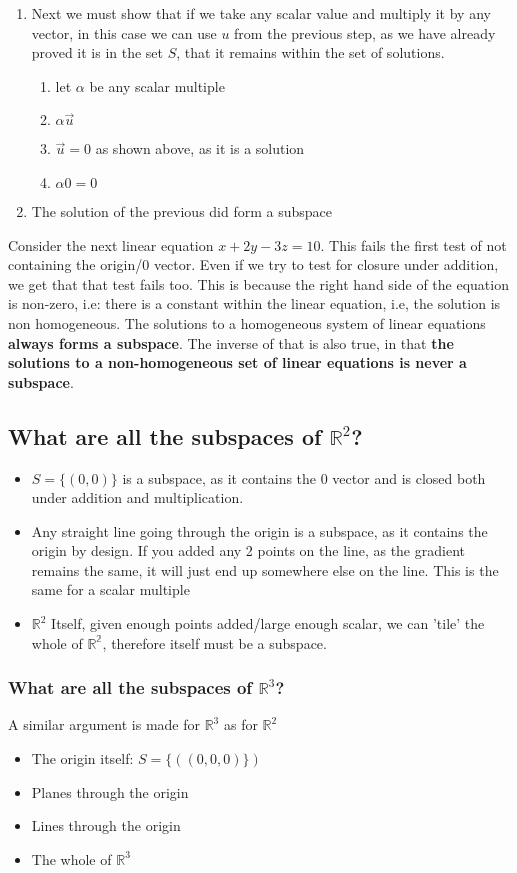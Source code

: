 \documentclass[11pt]{book}
\begin{document}
{\begin{enumerate}
\begin{enumerate}
	\end{enumerate}
	\item{Next we must show that if we take any scalar value and multiply it by any vector, in this case we can use $u$ from the previous step, as we have already proved it is in the set  $S$, that it remains within the set of solutions. }
	\begin{enumerate}
		\item{let $\alpha$ be any scalar multiple}
		\item{$\alpha\vec{u}$}
		\item{$\vec{u}=0$ as shown above, as it is a solution}
		\item{$\alpha 0=0$}
	\end{enumerate}
	\item{The solution of the previous did form a subspace}
\end{enumerate}
\par{Consider the next linear equation $x+2y-3z=10$. This fails the first test of not containing the origin/0 vector. Even if we try to test for closure under addition, we get that that test fails too. This is because the right hand side of the equation is non-zero, i.e: there is a constant within the linear equation, i.e, the solution is non homogeneous. The solutions to a homogeneous system of linear equations \textbf{always forms a subspace}. The inverse of that is also true, in that \textbf{the solutions to a non-homogeneous set of linear equations is never a subspace}.}
\subsection{What are all the subspaces of $\mathbb{R}^{2}$?}
\begin{itemize}
	\item{$S=\lbrace\left(0,0\right)\rbrace$ is a subspace, as it contains the 0 vector and is closed both under addition and multiplication.}
	\item{Any straight line going through the origin is a subspace, as it contains the origin by design. If you added any 2 points on the line, as the gradient remains the same, it will just end up somewhere else on the line. This is the same for a scalar multiple}
	\item{$\mathbb{R}^{2}$ Itself, given enough points added/large enough scalar, we can 'tile' the whole of $\mathbb{R^{2}}$, therefore itself must be a subspace.}
\end{itemize}
\subsubsection{What are all the subspaces of $\mathbb{R}^{3}$?}
\par{A similar argument is made for $\mathbb{R}^{3}$ as for $\mathbb{R}^{2}$}
\begin{itemize}
	\item{The origin itself: $S=\lbrace(\left(0,0,0\right)\rbrace)$}
	\item{Planes through the origin}
	\item{Lines through the origin}
	\item{The whole of $\mathbb{R}^{3}$}
\end{itemize}
}
\end{document}
